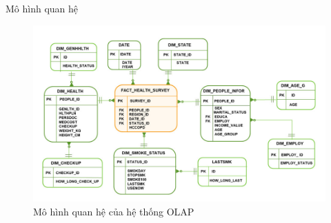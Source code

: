 Mô hình quan hệ
\begin{center}
        \begin{figure}[!h]
            \centering
            \includegraphics[scale = 0.4]{van/oltp_erd.png}
             \caption{Mô hình quan hệ của hệ thống OLAP}
        \end{figure}
\end{center}
    







